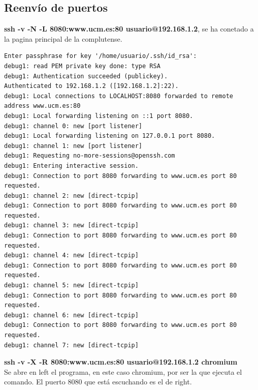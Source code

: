 \documentclass[11pt]{article}
\begin{document}
    \subsection{Reenvío de puertos}
      \par
      \textbf{ssh -v -N -L 8080:www.ucm.es:80 usuario@192.168.1.2}, se ha conetado a la pagina principal
      de la complutense.

\begin{lstlisting}
Enter passphrase for key '/home/usuario/.ssh/id_rsa': 
debug1: read PEM private key done: type RSA
debug1: Authentication succeeded (publickey).
Authenticated to 192.168.1.2 ([192.168.1.2]:22).
debug1: Local connections to LOCALHOST:8080 forwarded to remote address www.ucm.es:80
debug1: Local forwarding listening on ::1 port 8080.
debug1: channel 0: new [port listener]
debug1: Local forwarding listening on 127.0.0.1 port 8080.
debug1: channel 1: new [port listener]
debug1: Requesting no-more-sessions@openssh.com
debug1: Entering interactive session.
debug1: Connection to port 8080 forwarding to www.ucm.es port 80 requested.
debug1: channel 2: new [direct-tcpip]
debug1: Connection to port 8080 forwarding to www.ucm.es port 80 requested.
debug1: channel 3: new [direct-tcpip]
debug1: Connection to port 8080 forwarding to www.ucm.es port 80 requested.
debug1: channel 4: new [direct-tcpip]
debug1: Connection to port 8080 forwarding to www.ucm.es port 80 requested.
debug1: channel 5: new [direct-tcpip]
debug1: Connection to port 8080 forwarding to www.ucm.es port 80 requested.
debug1: channel 6: new [direct-tcpip]
debug1: Connection to port 8080 forwarding to www.ucm.es port 80 requested.
debug1: channel 7: new [direct-tcpip]
\end{lstlisting}

      \bigskip
      \par
      \textbf{ssh -v -X -R 8080:www.ucm.es:80 usuario@192.168.1.2 chromium}\\
      Se abre en left el programa, en este caso chromium, por ser la que ejecuta el comando. El
      puerto 8080 que está escuchando es el de right.
\end{document}

